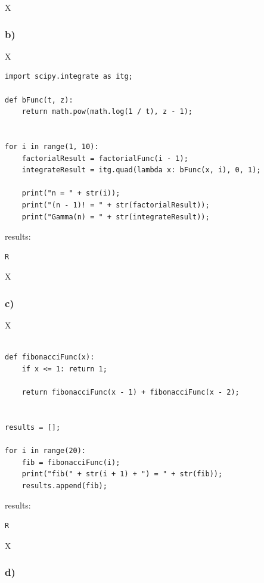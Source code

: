 X



\subsubsection{b)}

X

\begin{lstlisting}[caption=todo]
import scipy.integrate as itg;

def bFunc(t, z):
	return math.pow(math.log(1 / t), z - 1);


for i in range(1, 10):
	factorialResult = factorialFunc(i - 1);
	integrateResult = itg.quad(lambda x: bFunc(x, i), 0, 1);
	
	print("n = " + str(i));
	print("(n - 1)! = " + str(factorialResult));
	print("Gamma(n) = " + str(integrateResult));

\end{lstlisting}


results:

\begin{lstlisting}[caption=Result of 1.1 a), keywordstyle=\color{black}]
R
\end{lstlisting}

X



\subsubsection{c)}

X

\begin{lstlisting}[caption=todo]

def fibonacciFunc(x):
	if x <= 1: return 1;
	
	return fibonacciFunc(x - 1) + fibonacciFunc(x - 2);


results = [];

for i in range(20):
	fib = fibonacciFunc(i);
	print("fib(" + str(i + 1) + ") = " + str(fib));
	results.append(fib);

\end{lstlisting}


results:

\begin{lstlisting}[caption=Result of 1.1 a), keywordstyle=\color{black}]
R
\end{lstlisting}

X



\subsubsection{d)}

